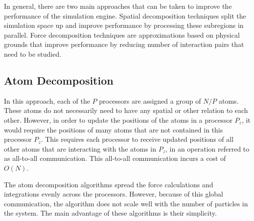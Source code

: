\documentclass[conference]{IEEEtran}
\begin{document}
    In general, there are two main approaches that can be taken to improve the performance of the
    simulation engine. Spatial decomposition techniques split the simulation space up and improve performance by
    processing these subregions in parallel. Force decomposition techniques are approximations based on physical grounds
    that improve performance by reducing number of interaction pairs that need to be studied.

    \subsection{Atom Decomposition}
    In this approach, each of the $P$ processors are assigned a group of $N/P$ atoms. These atoms do not necessarily
    need to have any spatial or other relation to each other. However, in order to update the positions of the atoms
    in a processor $P_z$, it would require the positions of many atoms that are not contained in this processor
    $P_z$. This requires each processor to receive updated positions of all other atoms that are interacting with
    the atoms in $P_z$, in an operation referred to as all-to-all communication. This all-to-all communication incurs
    a cost of $O(N)$.~\cite{plimpton1995fast, fox1989solving}
    
    The atom decomposition algorithms
    spread the force calculations and integrations evenly across the processors. However, because of this global
    communication, the algorithm does not scale well with the number of particles in the system. The main advantage
    of these algorithms is their simplicity.~\cite{plimpton1995fast, fox1989solving}
\end{document}
